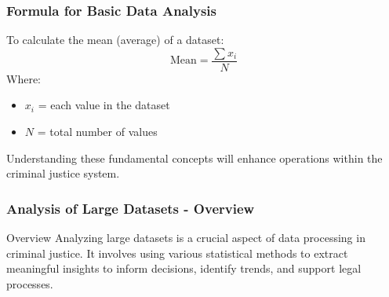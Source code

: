 \documentclass[aspectratio=169]{beamer}
\begin{document}
\begin{frame}[fragile]
    \frametitle{Formula for Basic Data Analysis}
    To calculate the mean (average) of a dataset:
    \begin{equation}
        \text{Mean} = \frac{\sum x_i}{N}
    \end{equation}
    Where:
    \begin{itemize}
        \item $x_i$ = each value in the dataset
        \item $N$ = total number of values
    \end{itemize}
    
    Understanding these fundamental concepts will enhance operations within the criminal justice system.
\end{frame}

\begin{frame}
    \frametitle{Analysis of Large Datasets - Overview}
    \begin{block}{Overview}
        Analyzing large datasets is a crucial aspect of data processing in criminal justice. 
        It involves using various statistical methods to extract meaningful insights to inform 
        decisions, identify trends, and support legal processes.
    \end{block}
\end{frame}
\end{document}
